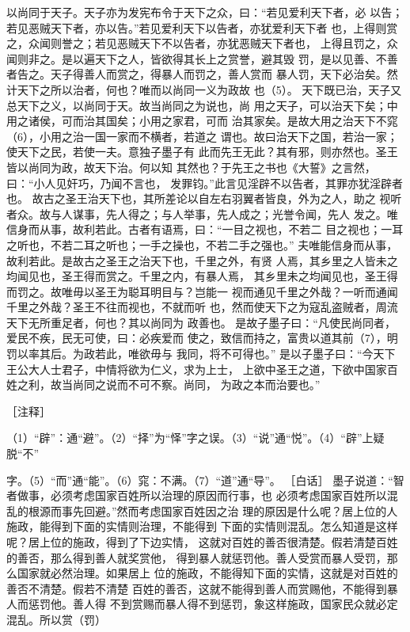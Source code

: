 \documentclass[12pt,UTF8]{ctexbook}
\begin{document}
以尚同于天子。天子亦为发宪布令于天下之众，曰：“若见爱利天下者，必 
以告；若见恶贼天下者，亦以告。”若见爱利天下以告者，亦犹爱利天下者 
也，上得则赏之，众闻则誉之；若见恶贼天下不以告者，亦犹恶贼天下者也， 
上得且罚之，众闻则非之。是以遍天下之人，皆欲得其长上之赏誉，避其毁 
罚，是以见善、不善者告之。天子得善人而赏之，得暴人而罚之，善人赏而 
暴人罚，天下必治矣。然计天下之所以治者，何也？唯而以尚同一义为政故 
也（5）。 
天下既已治，天子又总天下之义，以尚同于天。故当尚同之为说也，尚 
用之天子，可以治天下矣；中用之诸侯，可而治其国矣；小用之家君，可而 
治其家矣。是故大用之治天下不窕（6），小用之治一国一家而不横者，若道之 
谓也。故曰治天下之国，若治一家；使天下之民，若使一夫。意独子墨子有 
此而先王无此？其有邪，则亦然也。圣王皆以尚同为政，故天下治。何以知 
其然也？于先王之书也《大誓》之言然，曰：“小人见奸巧，乃闻不言也， 
发罪钧。”此言见淫辟不以告者，其罪亦犹淫辟者也。 
故古之圣王治天下也，其所差论以自左右羽翼者皆良，外为之人，助之 
视听者众。故与人谋事，先人得之；与人举事，先人成之；光誉令闻，先人 
发之。唯信身而从事，故利若此。古者有语焉，曰：“一目之视也，不若二 
目之视也；一耳之听也，不若二耳之听也；一手之操也，不若二手之强也。” 
夫唯能信身而从事，故利若此。是故古之圣王之治天下也，千里之外，有贤 
人焉，其乡里之人皆未之均闻见也，圣王得而赏之。千里之内，有暴人焉， 
其乡里未之均闻见也，圣王得而罚之。故唯毋以圣王为聪耳明目与？岂能一 
视而通见千里之外哉？一听而通闻千里之外哉？圣王不往而视也，不就而听 
也，然而使天下之为寇乱盗贼者，周流天下无所重足者，何也？其以尚同为 
政善也。 
是故子墨子曰：“凡使民尚同者，爱民不疾，民无可使，曰：必疾爱而 
使之，致信而持之，富贵以道其前（7），明罚以率其后。为政若此，唯欲毋与 
我同，将不可得也。” 
是以子墨子曰：“今天下王公大人士君子，中情将欲为仁义，求为上士， 
上欲中圣王之道，下欲中国家百姓之利，故当尚同之说而不可不察。尚同， 
为政之本而治要也。” 


［注释］ 

（1）“辟”：通“避”。（2）“择”为“怿”字之误。（3）“说”通“悦”。（4）“辟”上疑脱“不” 

字。（5）“而”通“能”。（6）窕：不满。（7）“道”通“导”。 
［白话］ 
墨子说道：“智者做事，必须考虑国家百姓所以治理的原因而行事，也 
必须考虑国家百姓所以混乱的根源而事先回避。”然而考虑国家百姓因之治 
理的原因是什么呢？居上位的人施政，能得到下面的实情则治理，不能得到 
下面的实情则混乱。怎么知道是这样呢？居上位的施政，得到了下边实情， 
这就对百姓的善否很清楚。假若清楚百姓的善否，那么得到善人就奖赏他， 
得到暴人就惩罚他。善人受赏而暴人受罚，那么国家就必然治理。如果居上 
位的施政，不能得知下面的实情，这就是对百姓的善否不清楚。假若不清楚 
百姓的善否，这就不能得到善人而赏赐他，不能得到暴人而惩罚他。善人得 
不到赏赐而暴人得不到惩罚，象这样施政，国家民众就必定混乱。所以赏（罚） 
\end{document}
